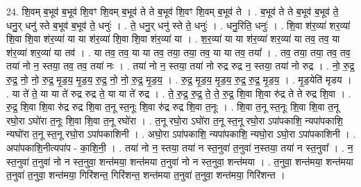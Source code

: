 \documentclass[17pt]{extarticle}
\begin{document}
24. शि॒वम् ब॒भूव॑ ब॒भूव॑ शि॒वꣳ शि॒वम् ब॒भूव॑ ते ते ब॒भूव॑ शि॒वꣳ शि॒वम् ब॒भूव॑ ते । . ब॒भूव॑ ते ते ब॒भूव॑ ब॒भूव॑ ते॒ धनु॒र् धनु॑ स्ते ब॒भूव॑ ब॒भूव॑ ते॒ धनुः॑ । . ते॒ धनु॒र् धनु॑ स्ते ते॒ धनुः॑ । . धनु॒रिति॒ धनुः॑ । . शि॒वा श॑र॒व्या॑ शर॒व्या॑ शि॒वा शि॒वा श॑र॒व्या॑ या या श॑र॒व्या॑ शि॒वा शि॒वा श॑र॒व्या॑ या । . श॒र॒व्या॑ या या श॑र॒व्या॑ शर॒व्या॑ या तव॒ तव॒ या श॑र॒व्या॑ शर॒व्या॑ या तव॑ । . या तव॒ तव॒ या या तव॒ तया॒ तया॒ तव॒ या या तव॒ तया᳚ । . तव॒ तया॒ तया॒ तव॒ तव॒ तया॑ नो न॒ स्तया॒ तव॒ तव॒ तया॑ नः । . तया॑ नो न॒ स्तया॒ तया॑ नो रुद्र रुद्र न॒ स्तया॒ तया॑ नो रुद्र । . नो॒ रु॒द्र॒ रु॒द्र॒ नो॒ नो॒ रु॒द्र॒ मृ॒ड॒य॒ मृ॒ड॒य॒ रु॒द्र॒ नो॒ नो॒ रु॒द्र॒ मृ॒ड॒य॒ । . रु॒द्र॒ मृ॒ड॒य॒ मृ॒ड॒य॒ रु॒द्र॒ रु॒द्र॒ मृ॒ड॒य॒ । . मृ॒ड॒येति॑ मृडय । . या ते॑ ते॒ या या ते॑ रुद्र रुद्र ते॒ या या ते॑ रुद्र । . ते॒ रु॒द्र॒ रु॒द्र॒ ते॒ ते॒ रु॒द्र॒ शि॒वा शि॒वा रु॑द्र ते ते रुद्र शि॒वा । . रु॒द्र॒ शि॒वा शि॒वा रु॑द्र रुद्र शि॒वा त॒नू स्त॒नूः शि॒वा रु॑द्र रुद्र शि॒वा त॒नूः । . शि॒वा त॒नू स्त॒नूः शि॒वा शि॒वा त॒नू रघो॒रा ऽघो॑रा त॒नूः शि॒वा शि॒वा त॒नू रघो॑रा । . त॒नू रघो॒रा ऽघो॑रा त॒नू स्त॒नू रघो॒रा ऽपा॑पकाशि॒ न्यपा॑पकाशि॒ न्यघो॑रा त॒नू स्त॒नू रघो॒रा ऽपा॑पकाशिनी । . अघो॒रा ऽपा॑पकाशि॒ न्यपा॑पकाशि॒ न्यघो॒रा ऽघो॒रा ऽपा॑पकाशिनी । . अपा॑पकाशि॒नीत्यपा॑प - का॒शि॒नी॒ । . तया॑ नो न॒ स्तया॒ तया॑ न स्त॒नुवा॑ त॒नुवा॑ न॒स्तया॒ तया॑ न स्त॒नुवा᳚ । . न॒ स्त॒नुवा॑ त॒नुवा॑ नो न स्त॒नुवा॒ शन्त॑मया॒ शन्त॑मया त॒नुवा॑ नो न स्त॒नुवा॒ शन्त॑मया । . त॒नुवा॒ शन्त॑मया॒ शन्त॑मया त॒नुवा॑ त॒नुवा॒ शन्त॑मया॒ गिरि॑शन्त॒ गिरि॑शन्त॒ शन्त॑मया त॒नुवा॑ त॒नुवा॒ शन्त॑मया॒ गिरि॑शन्त । \newline
\end{document}
